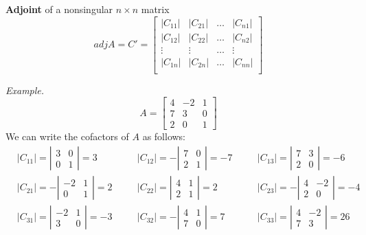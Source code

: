 \documentclass{./../../latex/handout}
\begin{document}
 \textbf{Adjoint} of a nonsingular $n \times n$ matrix \\
 \[adj A = C' = \left[\begin{array}{llll}
|C_{11}| & |C_{21}| & \hdots & |C_{n1}| \\
|C_{12}| & |C_{22}| & \hdots &  |C_{n2}| \\
\vdots &\vdots & \hdots &  \vdots \\
|C_{1n}| & |C_{2n}| & \hdots & |C_{nn}| \\
\end{array}\right]\]
\vspace{1em}

\textit{Example.} 
\[
A=\left[\begin{array}{ccc}
4 & -2 & 1 \\
7 & 3 & 0 \\
2 & 0 & 1
\end{array}\right]
\] 
We can write the cofactors of $A$ as follows: 
\begin{align*}
&\left|C_{11}\right|=\left|\begin{array}{cc}
3 & 0 \\
0 & 1
\end{array}\right|=3 \quad
&&\left|C_{12}\right|=-\left|\begin{array}{cc}
7 & 0 \\
2 & 1
\end{array}\right|=-7 \quad
&&\left|C_{13}\right|=\left|\begin{array}{cc}
7 & 3 \\
2 & 0
\end{array}\right|=-6 \\
&\left|C_{21}\right|=-\left|\begin{array}{cc}
-2 & 1 \\
0 & 1
\end{array}\right|=2 \quad
&& \left|C_{22}\right|=\left|\begin{array}{ll}
4 & 1 \\
2 & 1
\end{array}\right|=2 \quad
&&\left|C_{23}\right|=-\left|\begin{array}{cc}
4 & -2 \\
2 & 0
\end{array}\right|=-4 \\
&\left|C_{31}\right|=\left|\begin{array}{cc}
-2 & 1 \\
3 & 0
\end{array}\right|=-3 \quad
&&\left|C_{32}\right|=-\left|\begin{array}{ll}
4 & 1 \\
7 & 0
\end{array}\right|=7 \quad
&&\left|C_{33}\right|=\left|\begin{array}{cc}
4 & -2 \\
7 & 3
\end{array}\right|=26
\end{align*}
\end{document}
